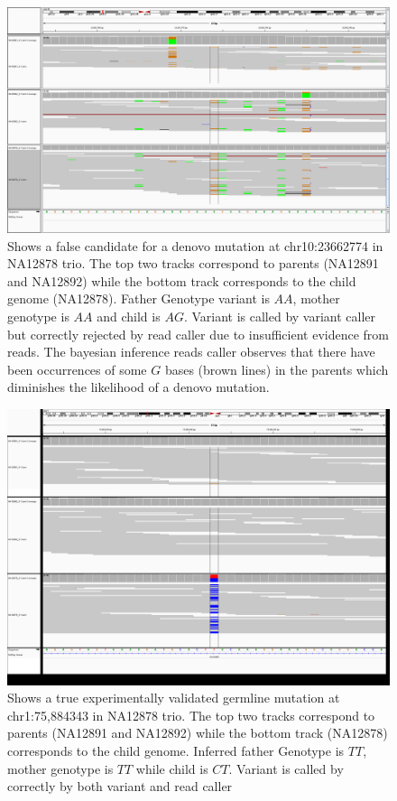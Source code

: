 \documentclass{article}
\begin{document}
\begin{figure}[!ht]
  \centering
  \includegraphics[width=6in]{chr10_23662774.png}
  \caption{Shows a false candidate for a denovo mutation at chr10:23662774 in NA12878 trio. The top two tracks correspond to parents (NA12891 and NA12892) while the bottom track corresponds to the child genome (NA12878). Father Genotype variant is $AA$, mother genotype is $AA$ and child is $AG$. Variant is called by variant caller but correctly rejected by read caller due to insufficient evidence from reads. The bayesian inference reads caller observes that there have been occurrences of some $G$ bases (brown lines) in the parents which diminishes the likelihood of a denovo mutation.}
   \label{fig:variant_caller}
\end{figure}


\begin{figure}[!ht]
  \centering
  \includegraphics[width=6in]{chr1_75,884,323_75,884,363.png}
  \caption{Shows a true experimentally validated germline mutation at chr1:75,884343 in NA12878 trio. The top two tracks correspond to parents (NA12891 and NA12892) while the bottom track (NA12878) corresponds to the child genome. Inferred father Genotype is $TT$, mother genotype is $TT$ while child is $CT$. Variant is called by correctly by both variant and read caller}
   \label{fig:germline}
\end{figure}
\end{document}
